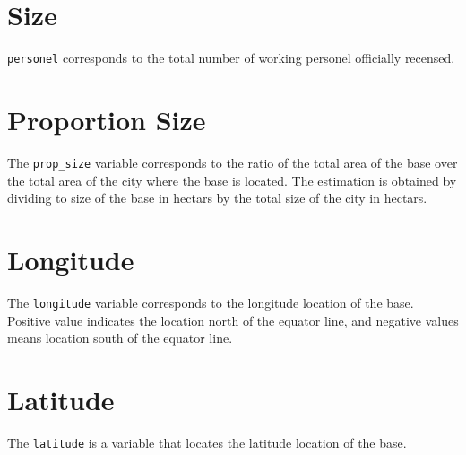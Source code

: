 \documentclass{article}\usepackage[]{graphicx}\usepackage[dvipsnames]{xcolor}
\begin{document}
\section{Size}

\verb|personel| corresponds to the total number of working personel 
officially recensed. 

\section{Proportion Size}

The \verb|prop_size| variable corresponds to the ratio of the 
total area of the base over the total area of the city where the 
base is located. The estimation is obtained by dividing to size of 
the base in hectars by the total size of the city in hectars. 

\section{Longitude}

The \verb|longitude| variable corresponds to the longitude location
of the base. Positive value indicates the location north of the
equator line, and negative values means location south of the equator
line.

\section{Latitude}

The \verb|latitude| is a variable that locates the latitude 
location of the base. 
\end{document}
